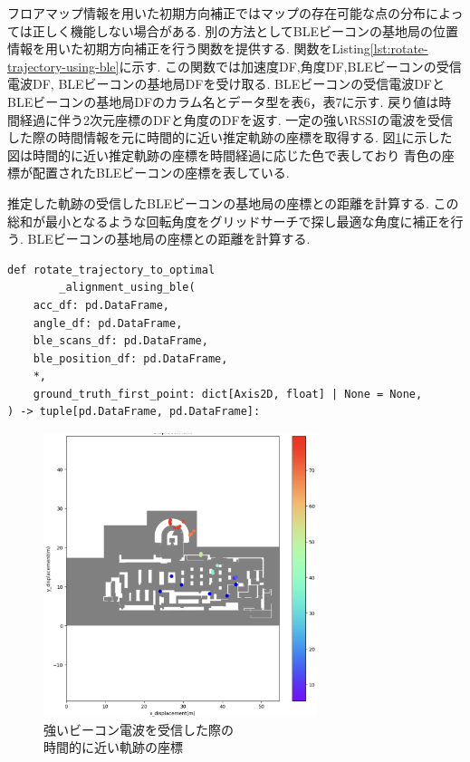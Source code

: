 フロアマップ情報を用いた初期方向補正ではマップの存在可能な点の分布によっては正しく機能しない場合がある.
別の方法としてBLEビーコンの基地局の位置情報を用いた初期方向補正を行う関数を提供する.
関数をListing\ref{lst:rotate-trajectory-using-ble}に示す.
この関数では加速度DF,角度DF,BLEビーコンの受信電波DF, BLEビーコンの基地局DFを受け取る.
BLEビーコンの受信電波DFとBLEビーコンの基地局DFのカラム名とデータ型を表6，表7に示す.
戻り値は時間経過に伴う2次元座標のDFと角度のDFを返す.
一定の強いRSSIの電波を受信した際の時間情報を元に時間的に近い推定軌跡の座標を取得する.
図\ref{fig:ble-merge}に示した図は時間的に近い推定軌跡の座標を時間経過に応じた色で表しており
青色の座標が配置されたBLEビーコンの座標を表している.

推定した軌跡の受信したBLEビーコンの基地局の座標との距離を計算する.
この総和が最小となるような回転角度をグリッドサーチで探し最適な角度に補正を行う.
BLEビーコンの基地局の座標との距離を計算する.

\begin{lstlisting}[caption={BLEビーコンの基地局の位置情報を使用した初期方向補正}, label=lst:rotate-trajectory-using-ble]
def rotate_trajectory_to_optimal
		_alignment_using_ble(
    acc_df: pd.DataFrame,
    angle_df: pd.DataFrame,
    ble_scans_df: pd.DataFrame,
    ble_position_df: pd.DataFrame,
    *,
    ground_truth_first_point: dict[Axis2D, float] | None = None,
) -> tuple[pd.DataFrame, pd.DataFrame]:
\end{lstlisting}


\begin{figure}[ht]
	\centering
	\includegraphics[width=80mm]{image/ble-merge.jpg}
	\caption{強いビーコン電波を受信した際の\\時間的に近い軌跡の座標}    \label{fig:ble-merge}
\end{figure}

